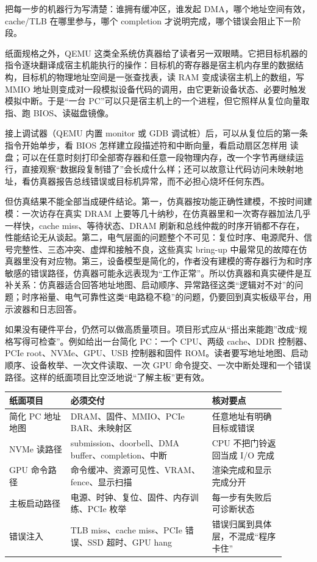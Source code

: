 把每一步的机器行为写清楚：谁拥有缓冲区，谁发起 DMA，哪个地址空间有效，cache/TLB 在哪里参与，哪个 completion 才说明完成，哪个错误会阻止下一阶段。

纸面规格之外，QEMU 这类全系统仿真器给了读者另一双眼睛。它把目标机器的指令逐块翻译成宿主机能执行的操作：目标机的寄存器是宿主机内存里的数据结构，目标机的物理地址空间是一张查找表，读 RAM 变成读宿主机上的数组，写 MMIO 地址则变成对一段模拟设备代码的调用，由它更新设备状态、必要时触发模拟中断。于是“一台 PC”可以只是宿主机上的一个进程，但它照样从复位向量取指、跑 BIOS、读磁盘镜像。

接上调试器（QEMU 内置 monitor 或 GDB 调试桩）后，可以从复位后的第一条指令开始单步，看 BIOS 怎样建立段描述符和中断向量，看启动扇区怎样用  读盘；可以在任意时刻打印全部寄存器和任意一段物理内存，改一个字节再继续运行，直接观察“数据段复制错了”会长成什么样；还可以故意让代码访问未映射地址，看仿真器报告总线错误或目标机异常，而不必担心烧坏任何东西。

但仿真结果不能全部当成硬件结论。第一，仿真器按功能正确性建模，不按时间建模：一次访存在真实 DRAM 上要等几十纳秒，在仿真器里和一次寄存器加法几乎一样快，cache miss、等待状态、DRAM 刷新和总线仲裁的时序开销都不存在，性能结论无从谈起。第二，电气层面的问题整个不可见：复位时序、电源爬升、信号完整性、三态冲突、虚焊和接触不良，这些真实 bring-up 中最常见的故障在仿真器里没有对应物。第三，设备模型是简化的，作者没有建模的寄存器行为和时序敏感的错误路径，仿真器可能永远表现为“工作正常”。所以仿真器和真实硬件是互补关系：仿真器适合回答地址地图、启动顺序、异常路径这类“逻辑对不对”的问题；时序裕量、电气可靠性这类“电路稳不稳”的问题，仍要回到真实板级平台，用示波器和日志回答。

如果没有硬件平台，仍然可以做高质量项目。项目形式应从“搭出来能跑”改成“规格写得可检查”。例如给出一台简化 PC：一个 CPU、两级 cache、DDR 控制器、PCIe root、NVMe、GPU、USB 控制器和固件 ROM。读者要写地址地图、启动顺序、设备枚举、一次文件读取、一次 GPU 命令提交、一次中断处理和一个错误路径。这样的纸面项目比空泛地说“了解主板”更有效。

\begin{longtable}{L{0.2\linewidth}L{0.46\linewidth}L{0.24\linewidth}}
\toprule
纸面项目 & 必须交付 & 核对要点 \\
\midrule
简化 PC 地址地图 & DRAM、固件、MMIO、PCIe BAR、未映射区 & 任意地址有明确目标或错误 \\\tablerowrule
NVMe 读路径 & submission、doorbell、DMA buffer、completion、中断 & CPU 不把门铃返回当成 I/O 完成 \\\tablerowrule
GPU 命令路径 & 命令缓冲、资源可见性、VRAM、fence、显示扫描 & 渲染完成和显示完成分开 \\\tablerowrule
主板启动路径 & 电源、时钟、复位、固件、内存训练、PCIe 枚举 & 每一步有失败后可诊断状态 \\\tablerowrule
错误注入 & TLB miss、cache miss、PCIe 错误、SSD 超时、GPU hang & 错误归属到具体层，不混成“程序卡住” \\
\bottomrule
\end{longtable}

